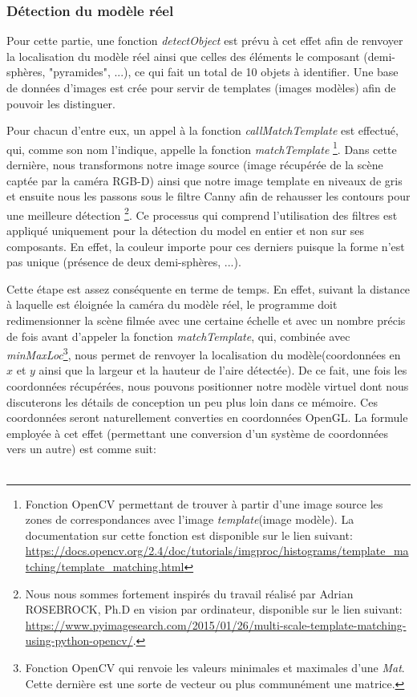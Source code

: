 \documentclass[a4paper, 12pt]{book}
\newcounter{program}[subsection]
\begin{document}
\subsubsection{Détection du modèle réel}  

Pour cette partie, une fonction \emph{detectObject} est prévu à cet effet afin de renvoyer la localisation du modèle réel ainsi que celles des éléments le composant (demi-sphères, "pyramides", ...), ce qui fait un total de 10 objets à identifier. Une base de données d'images est crée pour servir de templates (images modèles) afin de pouvoir les distinguer. \par Pour chacun d'entre eux, un appel à la fonction \emph{callMatchTemplate} est effectué, qui, comme son nom l'indique, appelle la fonction \emph{matchTemplate} \footnote{Fonction OpenCV permettant de trouver à partir d'une image source les zones de correspondances avec l'image \emph{template}(image modèle). La documentation sur cette fonction est disponible sur le lien suivant: \url{https://docs.opencv.org/2.4/doc/tutorials/imgproc/histograms/template_matching/template_matching.html}}. Dans cette dernière, nous transformons notre image source (image récupérée de la scène captée par la caméra RGB-D) ainsi que notre image template en niveaux de gris et ensuite nous les passons sous le filtre Canny afin de rehausser les contours pour une meilleure détection \footnote{Nous nous sommes fortement inspirés du travail réalisé par Adrian ROSEBROCK, Ph.D en vision par ordinateur, disponible sur le lien suivant: \url {https://www.pyimagesearch.com/2015/01/26/multi-scale-template-matching-using-python-opencv/}.}. Ce processus qui comprend l'utilisation des filtres est appliqué uniquement pour la détection du model en entier et non sur ses composants. En effet, la couleur importe pour ces derniers puisque la forme n'est pas unique (présence de deux demi-sphères, ...).
\par Cette étape est assez conséquente en terme de temps. En effet, suivant la distance à laquelle est éloignée la caméra du modèle réel, le programme doit redimensionner la scène filmée avec une certaine échelle et avec un nombre précis de fois avant d'appeler la fonction \emph{matchTemplate}, qui, combinée avec \emph{minMaxLoc}\footnote{Fonction OpenCV qui renvoie les valeurs minimales et maximales d'une \emph{Mat}. Cette dernière est une sorte de vecteur ou plus communément une matrice.}, nous permet de renvoyer la localisation du modèle(coordonnées en $x$ et $y$ ainsi que la largeur et la hauteur de l'aire détectée). 
 De ce fait, une fois les coordonnées récupérées, nous pouvons positionner notre modèle virtuel dont nous discuterons les détails de conception un peu plus loin dans ce mémoire. Ces coordonnées seront naturellement converties en coordonnées OpenGL. La formule employée à cet effet (permettant une conversion d'un système de coordonnées vers un autre) est comme suit:\\ \\
\end{document}
